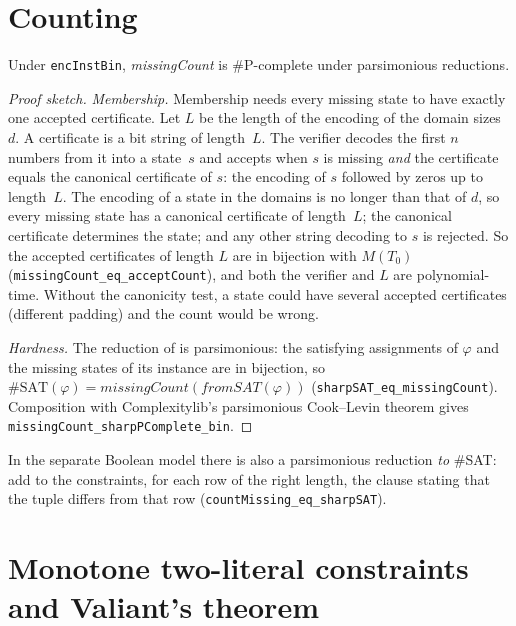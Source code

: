 \documentclass[a4paper,UKenglish,cleveref,autoref,thm-restate]{lipics-v2021}
\begin{document}
\section{Counting}
\label{sec:counting}

\begin{theorem}
\label{thm:counting}
Under \lstinline{encInstBin}, \textit{missingCount} is \#P-complete under parsimonious
reductions.
\end{theorem}

\begin{proof}[Proof sketch]
\emph{Membership.} Membership needs every missing state to have exactly one accepted
certificate. Let $L$ be the length of the encoding of the domain sizes~$d$. A certificate is a
bit string of length~$L$. The verifier decodes the first $n$ numbers from it into a state~$s$
and accepts when $s$ is missing \emph{and} the certificate equals the canonical certificate of
$s$: the encoding of $s$ followed by zeros up to length~$L$. The encoding of a state in the
domains is no longer than that of $d$, so every missing state has a canonical certificate of
length~$L$; the canonical certificate determines the state; and any other string decoding to $s$
is rejected. So the accepted certificates of length $L$ are in bijection with $M(T_0)$
(\lstinline{missingCount_eq_acceptCount}), and both the verifier and $L$ are polynomial-time.
Without the canonicity test, a state could have several accepted certificates (different
padding) and the count would be wrong.

\emph{Hardness.} The reduction of  is parsimonious: the satisfying
assignments of $\varphi$ and the missing states of its instance are in bijection, so
$\#\mathrm{SAT}(\varphi) = \textit{missingCount}(\mathit{fromSAT}(\varphi))$
(\lstinline{sharpSAT_eq_missingCount}). Composition with Complexitylib's parsimonious
Cook--Levin theorem gives \lstinline{missingCount_sharpPComplete_bin}.
\end{proof}

In the separate Boolean model there is also a parsimonious reduction \emph{to} \#SAT: add to the
constraints, for each row of the right length, the clause stating that the tuple differs from
that row (\lstinline{countMissing_eq_sharpSAT}).

\section{Monotone two-literal constraints and Valiant's theorem}
\label{sec:monotone}
\end{document}
